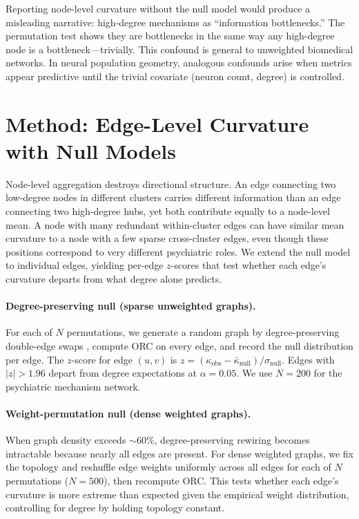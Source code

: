 \documentclass[11pt]{article}
\begin{document}
Reporting node-level curvature without the null model would produce a misleading narrative: high-degree mechanisms as ``information bottlenecks.'' The permutation test shows they are bottlenecks in the same way any high-degree node is a bottleneck---trivially. This confound is general to unweighted biomedical networks. In neural population geometry, analogous confounds arise when metrics appear predictive until the trivial covariate (neuron count, degree) is controlled.

\section{Method: Edge-Level Curvature with Null Models}
\label{sec:method}

Node-level aggregation destroys directional structure. An edge connecting two low-degree nodes in different clusters carries different information than an edge connecting two high-degree hubs, yet both contribute equally to a node-level mean. A node with many redundant within-cluster edges can have similar mean curvature to a node with a few sparse cross-cluster edges, even though these positions correspond to very different psychiatric roles. We extend the null model to individual edges, yielding per-edge $z$-scores that test whether each edge's curvature departs from what degree alone predicts.

\paragraph{Degree-preserving null (sparse unweighted graphs).} For each of $N$ permutations, we generate a random graph by degree-preserving double-edge swaps \citep{maslov2002specificity}, compute ORC on every edge, and record the null distribution per edge. The $z$-score for edge $(u,v)$ is $z = (\kappa_{\text{obs}} - \bar{\kappa}_{\text{null}}) / \sigma_{\text{null}}$. Edges with $|z| > 1.96$ depart from degree expectations at $\alpha = 0.05$. We use $N = 200$ for the psychiatric mechanism network.

\paragraph{Weight-permutation null (dense weighted graphs).} When graph density exceeds $\sim$60\%, degree-preserving rewiring becomes intractable because nearly all edges are present. For dense weighted graphs, we fix the topology and reshuffle edge weights uniformly across all edges for each of $N$ permutations ($N = 500$), then recompute ORC. This tests whether each edge's curvature is more extreme than expected given the empirical weight distribution, controlling for degree by holding topology constant.
\end{document}
